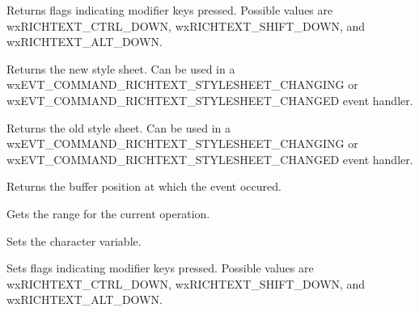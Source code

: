 \label{wxrichtexteventgetflags}


Returns flags indicating modifier keys pressed. Possible values are wxRICHTEXT\_CTRL\_DOWN,
wxRICHTEXT\_SHIFT\_DOWN, and wxRICHTEXT\_ALT\_DOWN.

\label{wxrichtexteventgetnewstylesheet}


Returns the new style sheet. Can be used in a wxEVT\_COMMAND\_RICHTEXT\_STYLESHEET\_CHANGING or
wxEVT\_COMMAND\_RICHTEXT\_STYLESHEET\_CHANGED event handler.

\label{wxrichtexteventgetoldstylesheet}


Returns the old style sheet. Can be used in a wxEVT\_COMMAND\_RICHTEXT\_STYLESHEET\_CHANGING or
wxEVT\_COMMAND\_RICHTEXT\_STYLESHEET\_CHANGED event handler.

\label{wxrichtexteventgetposition}


Returns the buffer position at which the event occured.

\label{wxrichtexteventgetrange}


Gets the range for the current operation.

\label{wxrichtexteventsetcharacter}


Sets the character variable.

\label{wxrichtexteventsetflags}


Sets flags indicating modifier keys pressed. Possible values are wxRICHTEXT\_CTRL\_DOWN,
wxRICHTEXT\_SHIFT\_DOWN, and wxRICHTEXT\_ALT\_DOWN.

\label{wxrichtexteventsetnewstylesheet}


